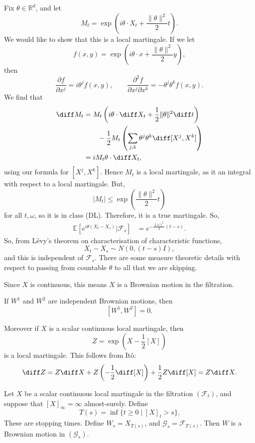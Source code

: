 \documentclass[12pt]{article}
\begin{document}
\begin{proofbox}
	Fix $\theta \in \mathbb{R}^{d}$, and let
	\[
	M_t = \exp \left( i \theta \cdot X_t + \frac{\|\theta\|^2}{2} t \right).
	\]
	We would like to show that this is a local martingale. If we let
	\[
	f(x, y) = \exp \left( i \theta \cdot x + \frac{\|\theta\|^2}{2} y \right),
	\]
	then
	\[
	\frac{\partial f}{\partial x^j} = i \theta^{j} f(x, y), \qquad \frac{\partial^2 f}{\partial x^{j} \partial x^{k}} = - \theta^{j} \theta^{k} f(x, y).
	\]
	We find that
	\begin{align*}
		\diff M_t &= M_t \left( i \theta \cdot \diff X_t + \frac 12 \|\theta\|^2 \diff t \right) \\
			  & \qquad - \frac 12 M_t \left( \sum_{j, k} \theta^{j} \theta^{k} \diff [X^{j}, X^{k}] \right) \\
			  &= i M_t \theta \cdot \diff X_t,
	\end{align*}
	using our formula for $[X^{j}, X^{k}]$. Hence $M_t$ is a local martingale, as it an integral with respect to a local martingale. But,
	\[
	|M_t| \leq \exp \left( \frac{\|\theta\|^2}{2} t\right)
	\]
	for all $t, \omega$, so it is in class (DL). Therefore, it is a true martingale. So,
	\begin{align*}
		\mathbb{E}[e^{i \theta (X_t - X_s)} | \mathcal{F}_s] &= e^{- \frac{\|\omega\|^2}{2} (t - s)}.
	\end{align*}
	So, from L\'evy's theorem on characterisation of characteristic functions,
	\[
	X_t - X_s \sim N(0, (t-s)I),
	\]
	and this is independent of $\mathcal{F}_s$. There are some measure theoretic details with respect to passing from countable $\theta$ to all that we are skipping.

	Since $X$ is continuous, this means $X$ is a Brownian motion in the filtration.
\end{proofbox}

\begin{remark}
	If $W^{1}$ and $W^{2}$ are independent Brownian motions, then
	\[
		[W^{1}, W^{2}] = 0.
	\]

	Moreover if $X$ is a scalar continuous local martingale, then
	\[
		Z = \exp \left( X - \frac 12 [X] \right)
	\]
	is a local martingale. This follows from It\^o:
	\[
		\diff Z = Z \diff X + Z \left( - \frac 12 \diff [X] \right) + \frac 12 Z \diff [X] = Z \diff X.
	\]
\end{remark}

\begin{theorem}
	Let $X$ be a scalar continuous local martingale in the filtration $(\mathcal{F}_t)$, and suppose that $[X]_\infty = \infty$ almost-surely. Define
	\[
		T(s) = \inf \{t \geq 0 \mid [X]_t > s\}.
	\]
	These are stopping times. Define $W_s = X_{T(s)}$, and $\mathcal{G}_s = \mathcal{F}_{T(s)}$. Then $W$ is a Brownian motion in $(\mathcal{G}_s)$.
\end{theorem}
\end{document}
